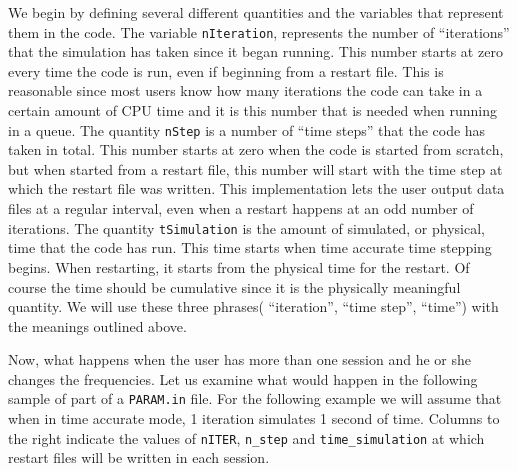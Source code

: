 We begin by defining several different quantities and the variables that 
represent them in the code.  The variable {\tt nIteration}, 
represents the number of ``iterations'' 
that the simulation has taken since it began running.  
This number starts at zero every time the code is run, even if beginning 
from a restart file.
This is reasonable since most users know how many iterations the code can take
in a certain amount of CPU time and it is this number that is needed when 
running in a queue.
The quantity {\tt nStep} is a number of ``time steps'' that the code has 
taken in total.  This number starts at zero when the code is started from 
scratch, but when started from a restart file, this
number will start with the time step at which the restart file was written.
This implementation lets the user output data files at a regular interval, even
when a restart happens at an odd number of iterations.
The quantity {\tt tSimulation} is the amount of simulated, or physical, 
time that the code has run.  
This time starts when time accurate time stepping begins.
When restarting, it starts from the physical time for the restart.
Of course the time should be cumulative since it is the physically meaningful
quantity.  We will 
use these three phrases( ``iteration'', ``time step'', ``time'') 
with the meanings outlined above.

Now, what happens when the user has more than one session and he or she
changes the frequencies.  Let us examine what would happen in the following
sample of part of a {\tt PARAM.in} file.  For the following example we will
assume that when in time accurate mode, 1 iteration simulates 1 second of time.
Columns to the right indicate the values of {\tt nITER}, {\tt n\_step} and
{\tt time\_simulation} at which restart files will be written in each session.

\clearpage

